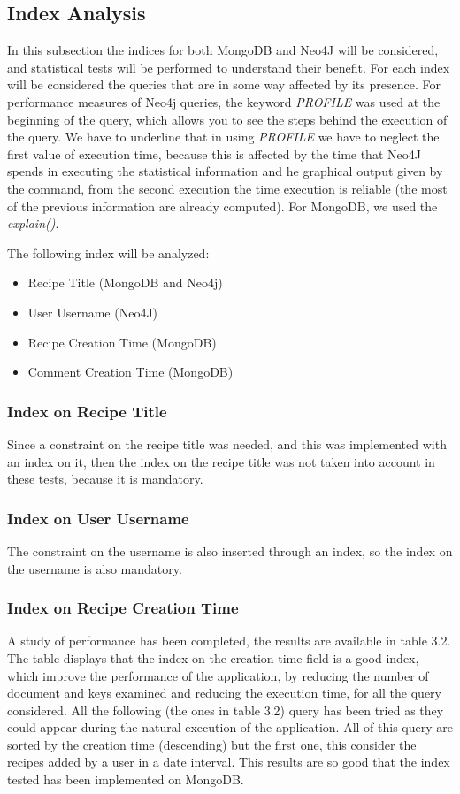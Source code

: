 \documentclass[a4paper]{report}
\begin{document}
\subsection{Index Analysis}

In this subsection the indices for both MongoDB and Neo4J will be considered, and statistical tests will be performed to understand their benefit. For each index will be considered the queries that are in some way affected by its presence. For performance measures of Neo4j queries, the keyword \emph{PROFILE} was used at the beginning of the query, which allows you to see the steps behind the execution of the query. We have to underline that in using \emph{PROFILE} we have to neglect the first value of execution time, because this is affected by the time that Neo4J spends in executing the statistical information and he graphical output given by the command, from the second execution the time execution is reliable (the most of the previous information are already computed). For MongoDB, we used the \emph{explain()}.

\noindent The following index will be analyzed:
\begin{itemize}
	\item Recipe Title (MongoDB and Neo4j)
	\item User Username (Neo4J)
	\item Recipe Creation Time (MongoDB)
	\item Comment Creation Time (MongoDB)
\end{itemize}

\subsubsection {Index on Recipe Title}
Since a constraint on the recipe title was needed, and this was implemented with an index on it, then the index on the recipe title was not taken into account in these tests, because it is mandatory.

\subsubsection {Index on User Username}
The constraint on the username is also inserted through an index, so the index on the username is also mandatory.

\subsubsection{Index on Recipe Creation Time}
A study of performance has been completed, the results are available in table 3.2. The table displays that the index on the creation time field is a good index, which improve the performance of the application, by reducing the number of document and keys examined and reducing the execution time, for all the query considered. All the following (the ones in table 3.2) query has been tried as they could appear during the natural execution of the application. All of this query are sorted by the creation time (descending) but the first one, this consider the recipes added by a user in a date interval. This results are so good that the index tested has been implemented on MongoDB.
\end{document}
